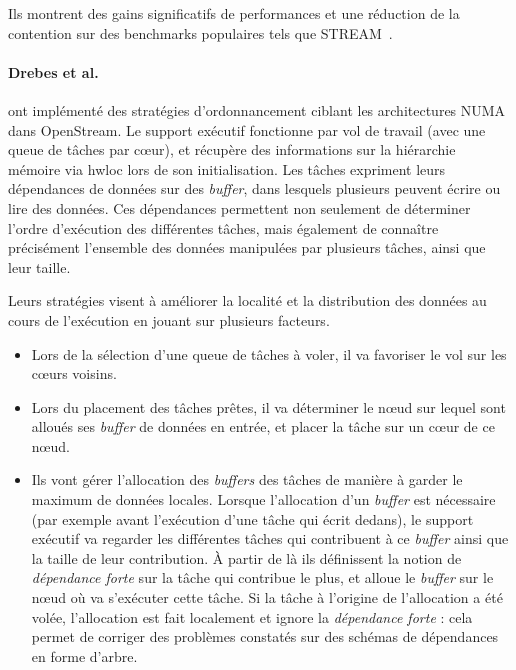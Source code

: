 Ils montrent des gains significatifs de performances et une réduction de la contention sur des benchmarks populaires tels que STREAM~\cite{mccalpin1995}.

\paragraph{Drebes et al.~\cite{Drebes2014}} ont implémenté des stratégies d'ordonnancement ciblant les architectures NUMA dans OpenStream.
Le support exécutif fonctionne par vol de travail (avec une queue de tâches par cœur), et récupère des informations sur la hiérarchie mémoire via hwloc lors de son initialisation.
Les tâches expriment leurs dépendances de données sur des \emph{buffer}, dans lesquels plusieurs peuvent écrire ou lire des données.
Ces dépendances permettent non seulement de déterminer l'ordre d'exécution des différentes tâches, mais également de connaître précisément l'ensemble des données manipulées par plusieurs tâches, ainsi que leur taille.

Leurs stratégies visent à améliorer la localité et la distribution des données au cours de l'exécution en jouant sur plusieurs facteurs.
\begin{itemize}
  \item Lors de la sélection d'une queue de tâches à voler, il va favoriser le vol sur les cœurs voisins.
  \item Lors du placement des tâches prêtes, il va déterminer le nœud sur lequel sont alloués ses \emph{buffer} de données en entrée, et placer la tâche sur un cœur de ce nœud.
  \item Ils vont gérer l'allocation des \emph{buffers} des tâches de manière à garder le maximum de données locales.
Lorsque l'allocation d'un \emph{buffer} est nécessaire (par exemple avant l'exécution d'une tâche qui écrit dedans), le support exécutif va regarder les différentes tâches qui contribuent à ce \emph{buffer} ainsi que la taille de leur contribution. À partir de là ils définissent la notion de \emph{dépendance forte} sur la tâche qui contribue le plus, et alloue le \emph{buffer} sur le nœud où va s'exécuter cette tâche.
Si la tâche à l'origine de l'allocation a été volée, l'allocation est fait localement et ignore la \emph{dépendance forte} : cela permet de corriger des problèmes constatés sur des schémas de dépendances en forme d'arbre.
\end{itemize}

